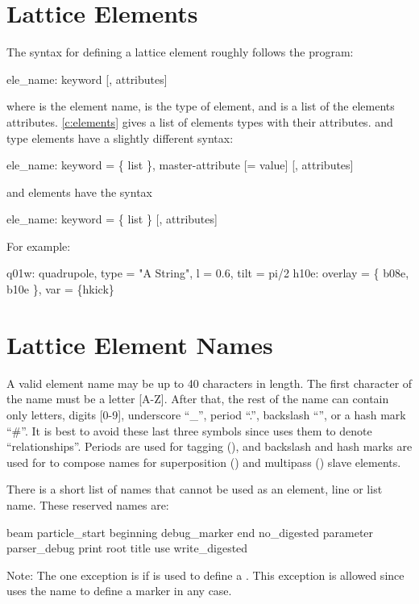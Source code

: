 \section{Lattice Elements}

The syntax for defining a lattice element roughly follows the
\mad\cite{b:maduser} program:
\begin{example}
  ele_name: keyword [, attributes]
\end{example}
where  is the element name,  is the type of
element, and  is a list of the elements
attributes. \cref{c:elements} gives a list of elements types with
their attributes.
 and  type elements have a slightly different syntax:
\begin{example}
  ele_name: keyword = \{ list \}, master-attribute [= value] [, attributes]
\end{example}
and  elements have the syntax
\begin{example}
  ele_name: keyword = \{ list \} [, attributes]
\end{example}  
For example:
\begin{example}
  q01w: quadrupole, type = "A String", l = 0.6, tilt = pi/2
  h10e: overlay = \{ b08e, b10e \}, var = \{hkick\}
\end{example}

\section{Lattice Element Names}
\label{s:ele.names}

A valid element name may be up to 40 characters in length. The first character of the name must be a
letter [A-Z]. After that, the rest of the name can contain only letters, digits [0-9], underscore
``_'', period ``.'', backslash ``\B'', or a hash mark ``\#''. It is best to avoid these last three
symbols since \bmad uses them to denote ``relationships''.  Periods are used for tagging
(), and backslash and hash marks are used for to compose names for superposition
() and multipass () slave elements.

There is a short list of names that cannot be used as an element, line or list name. These reserved names are:
\begin{example}
  beam
  particle_start
  beginning
  debug_marker
  end
  no_digested
  parameter
  parser_debug
  print
  root
  title
  use
  write_digested
\end{example}
Note: The one exception is if  is used to define a . This exception is allowed
since \bmad uses the  name to define a marker in any case.

